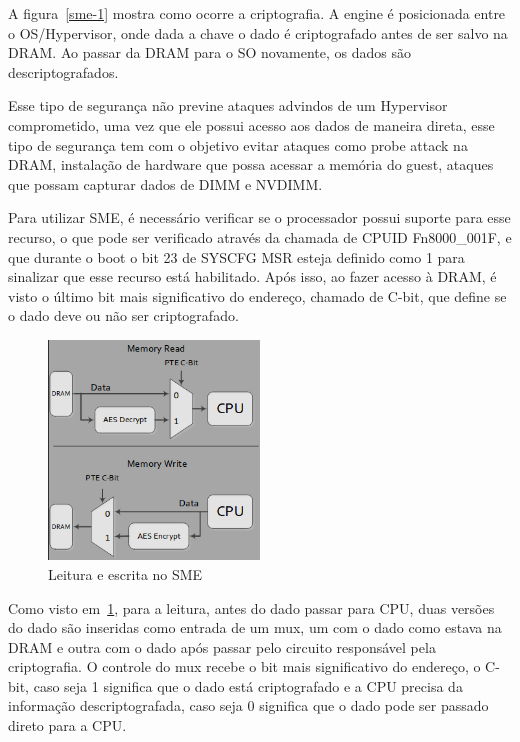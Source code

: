\documentclass{report}
\begin{document}
A figura~\ref{sme-1} mostra como ocorre a criptografia. A engine é posicionada
entre o OS/Hypervisor, onde dada a chave o dado é criptografado antes de ser
salvo na DRAM\@. Ao passar da DRAM para o SO novamente, os dados são
descriptografados.

Esse tipo de segurança não previne ataques advindos de um Hypervisor
comprometido, uma vez que ele possui acesso aos dados de maneira direta, esse
tipo de segurança tem com o objetivo evitar ataques como probe attack na
DRAM, instalação de hardware que possa acessar a memória do guest, ataques que
possam capturar dados de DIMM e NVDIMM\@.

Para utilizar SME, é necessário verificar se o processador possui suporte para
esse recurso, o que pode ser verificado através da chamada de CPUID
Fn8000\_001F, e que durante o boot o bit 23 de SYSCFG MSR esteja definido como
1 para sinalizar que esse recurso está habilitado. Após isso, ao fazer acesso à
DRAM, é visto o último bit mais significativo do endereço, chamado de C-bit,
que define se o dado deve ou não ser criptografado.

\begin{figure}[h]
    \centering
    \includegraphics[width=0.5\textwidth]{img/sme_read_write_architecture.png}
    \caption{Leitura e escrita no SME}\label{sme-read-write}
\end{figure}

Como visto em~\ref{sme-read-write}, para a leitura, antes do dado passar para
CPU, duas versões do dado são inseridas como entrada de um mux, um com o dado
como estava na DRAM e outra com o dado após passar pelo circuito responsável
pela criptografia. O controle do mux recebe o bit mais significativo do
endereço, o C-bit, caso seja 1 significa que o dado está criptografado e a CPU
precisa da informação descriptografada, caso seja 0 significa que o dado pode
ser passado direto para a CPU\@.
\end{document}
